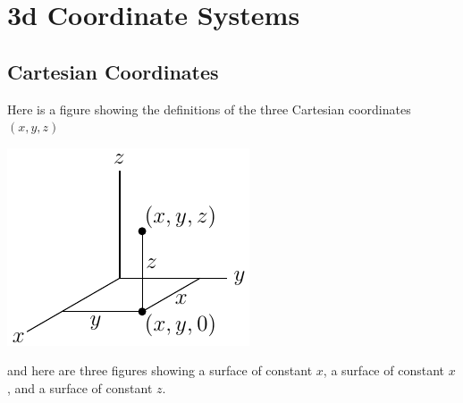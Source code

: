 \graphicspath{{figures/coord/}}

\renewcommand{\theequation}{\thechapter.\arabic{equation}}
\renewcommand{\thetheorem}{\thechapter.\arabic{theorem}}
\renewcommand{\thebc}{\thechapter.\arabic{theorem}}
\renewcommand{\theeg}{\thechapter.\arabic{theorem}}


\chapter{3d Coordinate Systems}\label{ap:3dcoord}

\section{Cartesian Coordinates}\label{ap:cartCoord}
Here is a figure showing the definitions of the 
three Cartesian coordinates $(x,y,z)$
\begin{efig}
\begin{center}
    \includegraphics{cart1.pdf}
\end{center}
\end{efig}
and here are three figures showing a surface of constant $x$,
a surface of constant $x$, and a surface of constant $z$.
